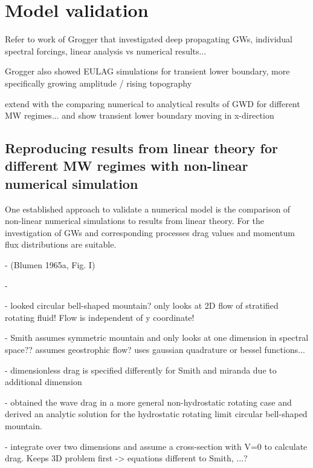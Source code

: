 \section{Model validation}

Refer to work of Grogger that investigated deep propagating GWs, individual spectral forcings, linear analysis vs numerical results...

Grogger also showed EULAG simulations for transient lower boundary, more specifically growing amplitude / rising topography 

extend with the comparing numerical to analytical results of GWD for different MW regimes...
and show transient lower boundary moving in x-direction


\subsection{Reproducing results from linear theory for different MW regimes with non-linear numerical simulation}


One established approach to validate a numerical model is the comparison of non-linear numerical simulations to results from linear theory. For the investigation of GWs and corresponding processes drag values and momentum flux distributions are suitable.

- \textcite{blumen} (Blumen 1965a, Fig. I)

- \textcite{bretherton_momentum_1969}

- \textcite{smith_influence_1979} looked circular bell-shaped mountain? only looks at 2D flow of stratified rotating fluid! Flow is independent of y coordinate! 

- Smith assumes symmetric mountain and only looks at one dimension in spectral space?? assumes geostrophic flow? uses gaussian quadrature or bessel functions...

- dimensionless drag is specified differently for Smith and miranda due to additional dimension

- \textcite{miranda_non-linear_1992} obtained the wave drag in a more general non-hydrostatic rotating case and derived an analytic solution for the hydrostatic rotating limit circular bell-shaped mountain. 

- integrate over two dimensions and assume a cross-section with V=0 to calculate drag. Keeps 3D problem first -> equations different to Smith, ...?

